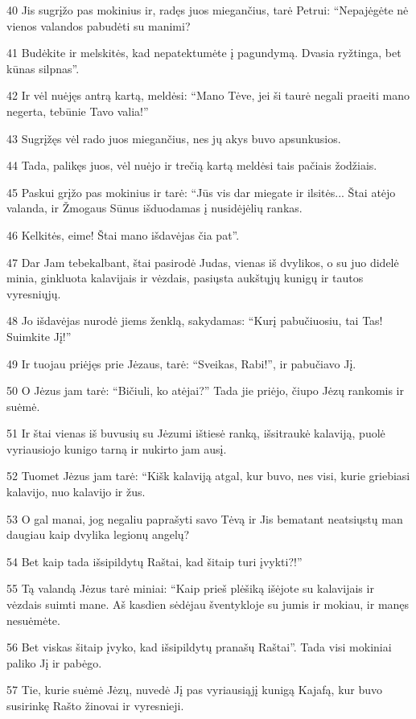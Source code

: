 \par 40 Jis sugrįžo pas mokinius ir, radęs juos miegančius, tarė Petrui: “Nepajėgėte nė vienos valandos pabudėti su manimi? 
\par 41 Budėkite ir melskitės, kad nepatektumėte į pagundymą. Dvasia ryžtinga, bet kūnas silpnas”. 
\par 42 Ir vėl nuėjęs antrą kartą, meldėsi: “Mano Tėve, jei ši taurė negali praeiti mano negerta, tebūnie Tavo valia!” 
\par 43 Sugrįžęs vėl rado juos miegančius, nes jų akys buvo apsunkusios. 
\par 44 Tada, palikęs juos, vėl nuėjo ir trečią kartą meldėsi tais pačiais žodžiais. 
\par 45 Paskui grįžo pas mokinius ir tarė: “Jūs vis dar miegate ir ilsitės... Štai atėjo valanda, ir Žmogaus Sūnus išduodamas į nusidėjėlių rankas. 
\par 46 Kelkitės, eime! Štai mano išdavėjas čia pat”. 
\par 47 Dar Jam tebekalbant, štai pasirodė Judas, vienas iš dvylikos, o su juo didelė minia, ginkluota kalavijais ir vėzdais, pasiųsta aukštųjų kunigų ir tautos vyresniųjų. 
\par 48 Jo išdavėjas nurodė jiems ženklą, sakydamas: “Kurį pabučiuosiu, tai Tas! Suimkite Jį!” 
\par 49 Ir tuojau priėjęs prie Jėzaus, tarė: “Sveikas, Rabi!”, ir pabučiavo Jį. 
\par 50 O Jėzus jam tarė: “Bičiuli, ko atėjai?” Tada jie priėjo, čiupo Jėzų rankomis ir suėmė. 
\par 51 Ir štai vienas iš buvusių su Jėzumi ištiesė ranką, išsitraukė kalaviją, puolė vyriausiojo kunigo tarną ir nukirto jam ausį. 
\par 52 Tuomet Jėzus jam tarė: “Kišk kalaviją atgal, kur buvo, nes visi, kurie griebiasi kalavijo, nuo kalavijo ir žus. 
\par 53 O gal manai, jog negaliu paprašyti savo Tėvą ir Jis bematant neatsiųstų man daugiau kaip dvylika legionų angelų? 
\par 54 Bet kaip tada išsipildytų Raštai, kad šitaip turi įvykti?!” 
\par 55 Tą valandą Jėzus tarė miniai: “Kaip prieš plėšiką išėjote su kalavijais ir vėzdais suimti mane. Aš kasdien sėdėjau šventykloje su jumis ir mokiau, ir manęs nesuėmėte. 
\par 56 Bet viskas šitaip įvyko, kad išsipildytų pranašų Raštai”. Tada visi mokiniai paliko Jį ir pabėgo. 
\par 57 Tie, kurie suėmė Jėzų, nuvedė Jį pas vyriausiąjį kunigą Kajafą, kur buvo susirinkę Rašto žinovai ir vyresnieji. 
